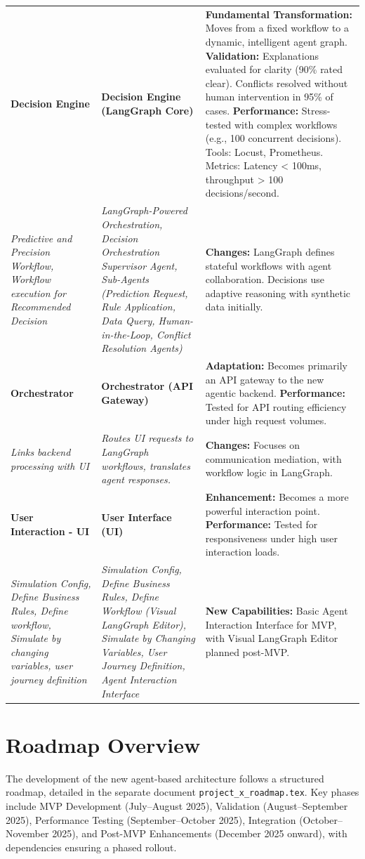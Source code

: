\documentclass{article}
\begin{document}
\begin{longtable}{|p{4cm}|p{6cm}|p{6cm}|}
    \textbf{Decision Engine} & \textbf{Decision Engine (LangGraph Core)} & \textbf{Fundamental Transformation:} Moves from a fixed workflow to a dynamic, intelligent agent graph. \textbf{Validation:} Explanations evaluated for clarity (90\% rated clear). Conflicts resolved without human intervention in 95\% of cases. \textbf{Performance:} Stress-tested with complex workflows (e.g., 100 concurrent decisions). Tools: Locust, Prometheus. Metrics: Latency < 100ms, throughput > 100 decisions/second. \\
    \textit{Predictive and Precision Workflow, Workflow execution for Recommended Decision} & \textit{LangGraph-Powered Orchestration, Decision Orchestration Supervisor Agent, Sub-Agents (Prediction Request, Rule Application, Data Query, Human-in-the-Loop, Conflict Resolution Agents)} & \textbf{Changes:} LangGraph defines stateful workflows with agent collaboration. Decisions use adaptive reasoning with synthetic data initially. \\
    \hline

    \textbf{Orchestrator} & \textbf{Orchestrator (API Gateway)} & \textbf{Adaptation:} Becomes primarily an API gateway to the new agentic backend. \textbf{Performance:} Tested for API routing efficiency under high request volumes. \\
    \textit{Links backend processing with UI} & \textit{Routes UI requests to LangGraph workflows, translates agent responses.} & \textbf{Changes:} Focuses on communication mediation, with workflow logic in LangGraph. \\
    \hline

    \textbf{User Interaction - UI} & \textbf{User Interface (UI)} & \textbf{Enhancement:} Becomes a more powerful interaction point. \textbf{Performance:} Tested for responsiveness under high user interaction loads. \\
    \textit{Simulation Config, Define Business Rules, Define workflow, Simulate by changing variables, user journey definition} & \textit{Simulation Config, Define Business Rules, Define Workflow (Visual LangGraph Editor), Simulate by Changing Variables, User Journey Definition, Agent Interaction Interface} & \textbf{New Capabilities:} Basic Agent Interaction Interface for MVP, with Visual LangGraph Editor planned post-MVP. \\
    \hline

\end{longtable}

\section{Roadmap Overview}
The development of the new agent-based architecture follows a structured roadmap, detailed in the separate document \texttt{project\_x\_roadmap.tex}. Key phases include MVP Development (July--August 2025), Validation (August--September 2025), Performance Testing (September--October 2025), Integration (October--November 2025), and Post-MVP Enhancements (December 2025 onward), with dependencies ensuring a phased rollout.
\end{document}
